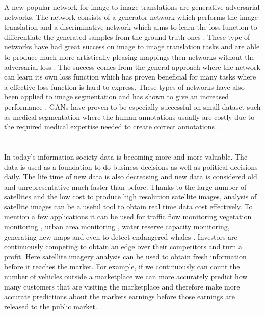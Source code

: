 \documentclass{kththesis}
\begin{document}
A new popular network for image to image translations are generative adversarial networks. The network consists of a generator network which performs the image translation and a discriminative network which aims to learn the loss function to differentiate the generated samples from the ground truth ones \parencite{goodfellow_nips_2016}. These type of networks have had great success on image to image translation tasks and are able to produce much more artistically pleasing mappings then networks without the adversarial loss \parencite{ledig_photo-realistic_2016, isola_image--image_2016}. The success comes from the general approach where the network can learn its own loss function which has proven beneficial for many tasks where a effective loss function is hard to express. These types of networks have also been applied to image segmentation and has shown to give an increased performance \parencite{luc_semantic_2016, souly_semi_2017}. GANs have proven to be especially successful on small dataset such as medical segmentation where the human annotations usually are costly due to the required medical expertise needed to create correct annotations \parencite{souly_semi_2017, xue_segan:_2017, yang_automatic_2017, rezaei_conditional_2017, arbelle_microscopy_2017}.\\
\\
\\
In today's information society data is becoming more and more valuable. The data is used as a foundation to do business decisions  as well as political decisions daily. The life time of new data is also decreasing and new data is considered old and unrepresentative much faster than before. Thanks to the large number of satellites and the low cost to produce high resolution satellite images, analysis of satellite images can be a useful tool to obtain real time data cost effectively. To mention a few applications it can be used for traffic flow monitoring \parencite{ruhe_traffic_2003, moranduzzo_automatic_2014} vegetation monitoring \parencite{uto_characterization_2013, berni_thermal_2009}, urban area monitoring \parencite{moranduzzo_lbp-based_2015}, water reserve capacity monitoring, generating new maps \parencite{isola_image--image_2016} and even to detect endangered whales \parencite{polzounov_right_2016}. Investors are continuously competing to obtain an edge over their competitors and turn a profit. Here satellite imagery analysis can be used to obtain fresh information before it reaches the market. For example, if we continuously can count the number of vehicles outside a marketplace we can more accurately predict how many customers that are visiting the marketplace and therefore make more accurate predictions about the markets earnings before those earnings are released to the public market.\\
\end{document}
